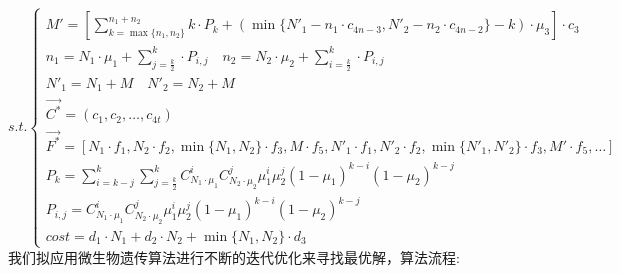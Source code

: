 \documentclass[withoutpreface,bwprint]{cumcmthesis} %
\begin{document}
\begin{equation*}
	s.t.\begin{cases}
		M'=[\sum_{k=\max \{n_{1},n_{2}\}}^{n_{1}+n_{2}}k\cdot P_{k}+(\min \{N'_{1}-n_{1}\cdot c_{4n-3},N'_{2}-n_{2}\cdot c_{4n-2}\}-k)\cdot \mu_{3}]\cdot c_{3}                                \\
		n_{1}=N_{1}\cdot \mu_{1}+\sum_{j=\frac{k}{2}}^{k}\cdot P_{i,j} \quad n_{2}=N_{2}\cdot \mu_{2}+\sum_{i=\frac{k}{2}}^{k}\cdot P_{i,j}                                                    \\
		N'_{1}=N_{1}+M \quad N'_{2}=N_{2}+M                                                                                                                                                    \\
		\vec{C^{*}}=(c_{1},c_{2},\dots,c_{4t})                                                                                                                                                 \\
		\vec{F^{*}}=[N_{1}\cdot f_{1},N_{2}\cdot f_{2},\min \{N_{1},N_{2}\}\cdot f_{3},M\cdot f_{5},N'_{1}\cdot f_{1},N'_{2}\cdot f_{2},\min \{N'_{1},N'_{2}\}\cdot f_{3},M'\cdot f_{5},\dots] \\
		P_{k}=\sum_{i=k-j}^{k}\sum_{j=\frac{k}{2}}^{k}C_{N_{1}\cdot\mu_{1}}^{i}C_{N_{2}\cdot\mu_{2}}^{j}\mu_{1}^{i}\mu_{2}^{j}(1-\mu_{1})^{k-i}(1-\mu_{2})^{k-j}                               \\
		P_{i,j}=C_{N_{1}\cdot\mu_{1}}^{i}C_{N_{2}\cdot\mu_{2}}^{j}\mu_{1}^{i}\mu_{2}^{j}(1-\mu_{1})^{k-i}(1-\mu_{2})^{k-j}\\
		cost=d_{1}\cdot N_{1}+d_{2}\cdot N_{2}+\min \{ N_{1},N_{2}\}\cdot d_{3}
	\end{cases}
\end{equation*}
我们拟应用微生物遗传算法进行不断的迭代优化来寻找最优解，算法流程:
\end{document}
